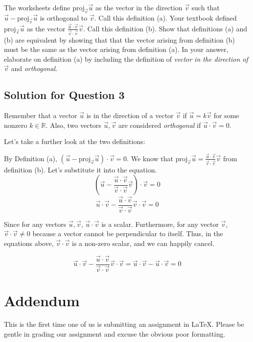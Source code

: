 \documentclass[letter]{article}
\newcommand{\R}{\mathbb{R}}
\newcommand{\Proj}{\mathrm{proj}}
\begin{document}
The worksheets define $\Proj_{\vec v}\vec u$ as the vector in the direction $\vec v$ such that
      $\vec u-\Proj_{\vec v}\vec u$ is orthogonal to $\vec v$.  Call this definition (a).  Your textbook
      defined $\Proj_{\vec v}\vec u$ as the vector $\frac{\vec u\cdot \vec v}{\vec v\cdot\vec v}\vec v$.
      Call this definition (b).  Show that definitions (a) and (b) are equivalent by showing
      that that the vector arising from definition (b) must be the same as the vector
      arising from definition (a).
      In your answer, elaborate on definition (a) by including
      the definition of \emph{vector in the direction of $\vec v$} and \emph{orthogonal}.

\subsection{Solution for Question 3}
    Remember that a vector $\vec u$ is in the direction of a vector $\vec v$ if $\vec u=k\vec v$ for some nonzero $k \in \R$.
    Also, two vectors $\vec u, \vec v$ are considered \emph{orthogonal} if $\vec u \cdot \vec v = 0$.

   Let's take a further look at the two definitions:

    By Definition (a), $(\vec u-\Proj_{\vec v}\vec u) \cdot \vec v = 0$. We know that $\Proj_{\vec v}\vec u = \frac{\vec u\cdot \vec v}{\vec v\cdot\vec v}\vec v$ from definition (b). Let's substitute it into the equation.
   \[
        (\vec u-\frac{\vec u\cdot \vec v}{\vec v\cdot\vec v}\vec v) \cdot \vec v = 0
    \]
    \[
        \vec u \cdot \vec v - \frac{\vec u\cdot \vec v}{\vec v\cdot\vec v}\vec v \cdot \vec v = 0
    \]

    Since for any vectors $\vec u, \vec v$, $\vec u \cdot \vec v$ is a scalar. Furthermore, for any vector $\vec v$, $\vec v \cdot \vec v \neq 0$ because a vector cannot be perpendicular to itself.
    Thus, in the equations above, $\vec v \cdot \vec v$ is a non-zero scalar, and we can happily cancel.

    \[
        \vec u \cdot \vec v - \frac{\vec u\cdot \vec v}{\vec v\cdot\vec v}\vec v \cdot \vec v = \vec u \cdot \vec v - \vec u \cdot \vec v = 0
    \]
\section{Addendum}
  This is the first time one of us is submitting an assignment in \LaTeX{}. Please be gentle in grading our assignment and excuse the obvious poor formatting.
\end{document}
